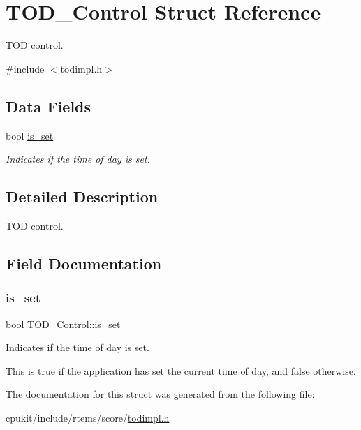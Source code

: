 \hypertarget{structTOD__Control}{}\section{T\+O\+D\+\_\+\+Control Struct Reference}
\label{structTOD__Control}


T\+OD control.  




{\ttfamily \#include $<$todimpl.\+h$>$}

\subsection*{Data Fields}
\begin{DoxyCompactItemize}
\item 
bool \mbox{\hyperlink{structTOD__Control_a33913bb1186ffbd392aa3c2d731f202f}{is\+\_\+set}}
\begin{DoxyCompactList}\small\item\em Indicates if the time of day is set. \end{DoxyCompactList}\end{DoxyCompactItemize}


\subsection{Detailed Description}
T\+OD control. 

\subsection{Field Documentation}
\mbox{\label{structTOD__Control_a33913bb1186ffbd392aa3c2d731f202f}} 
\subsubsection{\texorpdfstring{is\_set}{is\_set}}
{\footnotesize\ttfamily bool T\+O\+D\+\_\+\+Control\+::is\+\_\+set}



Indicates if the time of day is set. 

This is true if the application has set the current time of day, and false otherwise. 

The documentation for this struct was generated from the following file\+:\begin{DoxyCompactItemize}
\item 
cpukit/include/rtems/score/\mbox{\hyperlink{todimpl_8h}{todimpl.\+h}}\end{DoxyCompactItemize}
